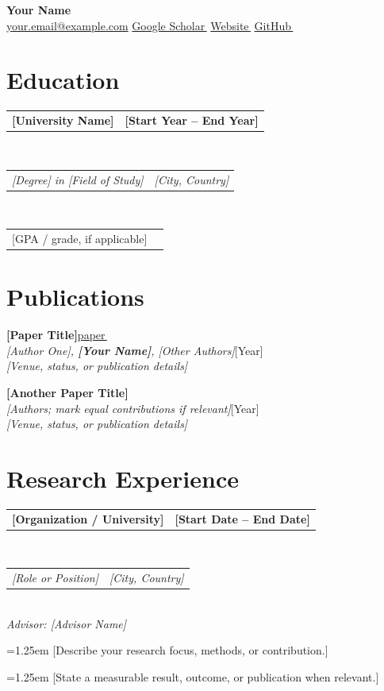 \documentclass[10pt,a4paper]{article}
\makeatletter
\newcommand{\CVName}{Your Name} %
\newcommand{\CVEmail}{your.email@example.com}
\newcommand{\CVScholarURL}{https://example.com/your-scholar-profile}
\newcommand{\CVWebsiteURL}{https://example.com/your-website}
\newcommand{\CVGitHubURL}{https://github.com/your-username}
\newcommand{\CVRow}[2]{%
  \begin{tabularx}{\linewidth}{@{}X>{\raggedleft\arraybackslash}p{.31\linewidth}@{}}#1&#2\end{tabularx}%
}
\newcommand{\CVLink}[2]{\href{#1}{#2\,\raisebox{.15ex}{\scriptsize\faExternalLink*}}}
\newcommand{\CVBullet}[1]{%
  \par\hangindent=1.25em\hangafter=1\noindent
  \hspace*{.25em}\textbullet\hspace{.45em}#1\par%
}
\makeatother
\begin{document}
\begin{center}
  {\LARGE\bfseries \CVName}\\[4pt]
  \small
  \href{mailto:\CVEmail}{\textcolor{accent}{\faEnvelope\hspace{.35em}\CVEmail}}
  \quad
  \CVLink{\CVScholarURL}{Google Scholar}
  \quad
  \CVLink{\CVWebsiteURL}{Website}
  \quad
  \CVLink{\CVGitHubURL}{GitHub}
\end{center}
\vspace{-5pt}

\section{Education}
\CVRow{\textbf{[University Name]}}{\textbf{[Start Year -- End Year]}}\\[-1pt]
\CVRow{\textit{[Degree] in [Field of Study]}}{\textit{[City, Country]}}\\[-1pt]
\CVRow{[GPA / grade, if applicable]}{[Expected graduation: Month Year]}

\section{Publications}
\textbf{[Paper Title]}\;\CVLink{https://doi.org/[DOI]}{paper}\\[-1pt]
\textit{[Author One], \textbf{[Your Name]}, [Other Authors]}\hfill [Year]\\[-1pt]
\textit{[Venue, status, or publication details]}
\vspace{3pt}

\textbf{[Another Paper Title]}\\[-1pt]
\textit{[Authors; mark equal contributions if relevant]}\hfill [Year]\\[-1pt]
\textit{[Venue, status, or publication details]}

\section{Research Experience}
\CVRow{\textbf{[Organization / University]}}{\textbf{[Start Date -- End Date]}}\\[-1pt]
\CVRow{\textit{[Role or Position]}}{\textit{[City, Country]}}\\[-1pt]
\textit{Advisor: [Advisor Name]}
\CVBullet{[Describe your research focus, methods, or contribution.]}
\CVBullet{[State a measurable result, outcome, or publication when relevant.]}
\vspace{-2pt}
\end{document}
